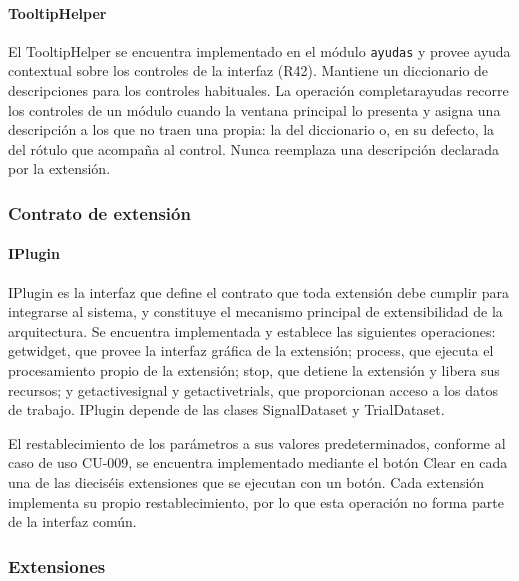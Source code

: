 \documentclass[11pt,a4paper]{article}
\DeclareRobustCommand{\_}{\textunderscore\allowbreak}
\begin{document}
\paragraph{TooltipHelper}
El TooltipHelper se encuentra implementado en el módulo \texttt{ayudas} y provee ayuda contextual sobre los controles de la interfaz (R42). Mantiene un diccionario de descripciones para los controles habituales. La operación completar\_ayudas recorre los controles de un módulo cuando la ventana principal lo presenta y asigna una descripción a los que no traen una propia: la del diccionario o, en su defecto, la del rótulo que acompaña al control. Nunca reemplaza una descripción declarada por la extensión.

\subsubsection{Contrato de extensión}

\paragraph{IPlugin}
IPlugin es la interfaz que define el contrato que toda extensión debe cumplir para integrarse al sistema, y constituye el mecanismo principal de extensibilidad de la arquitectura. Se encuentra implementada y establece las siguientes operaciones: get\_widget, que provee la interfaz gráfica de la extensión; process, que ejecuta el procesamiento propio de la extensión; stop, que detiene la extensión y libera sus recursos; y get\_active\_signal y get\_active\_trials, que proporcionan acceso a los datos de trabajo. IPlugin depende de las clases SignalDataset y TrialDataset.

El restablecimiento de los parámetros a sus valores predeterminados, conforme al caso de uso CU-009, se encuentra implementado mediante el botón Clear en cada una de las dieciséis extensiones que se ejecutan con un botón. Cada extensión implementa su propio restablecimiento, por lo que esta operación no forma parte de la interfaz común.

\subsubsection{Extensiones}
\end{document}
